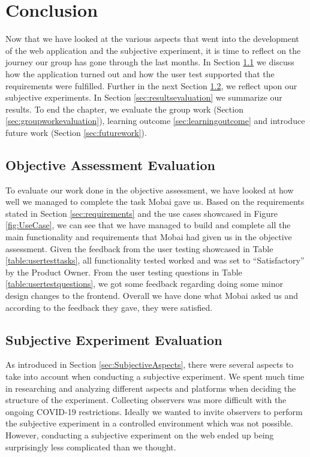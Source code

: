 \chapter{Conclusion}
\label{chap:Conclusion}
 Now that we have looked at the various aspects that went into the development of the web application and the subjective experiment, it is time to reflect on the journey our group has gone through the last months. In Section \ref{sec:objective} we discuss how the application turned out and how the user test supported that the requirements were fulfilled. Further in the next Section \ref{sec:subjectiveevaluation}, we reflect upon our subjective experiments. In Section \ref{sec:resultsevaluation} we summarize our results. To end the chapter, we evaluate the group work (Section \ref{sec:groupworkevaluation}), learning outcome \ref{sec:learningoutcome} and introduce future work (Section \ref{sec:futurework}).

\section{Objective Assessment Evaluation}
\label{sec:objective}
To evaluate our work done in the objective assessment, we have looked at how well we managed to complete the task Mobai gave us. Based on the requirements stated in Section \ref{sec:requirements} and the use cases showcased in Figure \ref{fig:UseCase}, we can see that we have managed to build and complete all the main functionality and requirements that Mobai had given us in the objective assessment. Given the feedback from the user testing showcased in Table \ref{table:usertesttasks}, all functionality tested worked and was set to ``Satisfactory'' by the Product Owner. From the user testing questions in Table \ref{table:usertestquestions}, we got some feedback regarding doing some minor design changes to the frontend. Overall we have done what Mobai asked us and according to the feedback they gave, they were satisfied. 

\section{Subjective Experiment Evaluation}
\label{sec:subjectiveevaluation}
As introduced in Section \ref{sec:SubjectiveAspects}, there were several aspects to take into account when conducting a subjective experiment. We spent much time in researching and analyzing different aspects and platforms when deciding the structure of the experiment. Collecting observers was more difficult with the ongoing COVID-19 restrictions. Ideally we wanted to invite observers to perform the subjective experiment in a controlled environment which was not possible. However, conducting a subjective experiment on the web ended up being surprisingly less complicated than we thought. 

